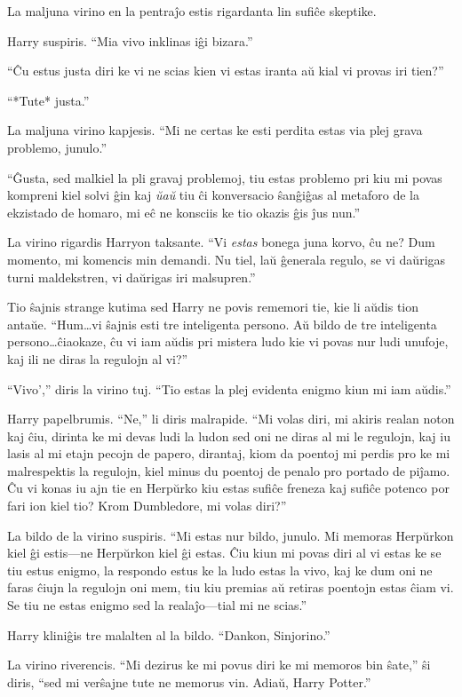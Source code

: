 La maljuna virino en la pentraĵo estis rigardanta lin sufiĉe skeptike.

Harry suspiris. ``Mia vivo inklinas iĝi bizara.''

``Ĉu estus justa diri ke vi ne scias kien vi estas iranta aŭ kial vi
provas iri tien?''

``*Tute* justa.''

La maljuna virino kapjesis. ``Mi ne certas ke esti perdita estas via
plej grava problemo, junulo.''

``Ĝusta, sed malkiel la pli gravaj problemoj, tiu estas problemo pri
kiu mi povas kompreni kiel solvi ĝin kaj \emph{ŭaŭ} tiu ĉi konversacio
ŝanĝiĝas al metaforo de la ekzistado de homaro, mi eĉ ne konsciis ke
tio okazis ĝis ĵus nun.''

La virino rigardis Harryon taksante. ``Vi \emph{estas} bonega juna
korvo, ĉu ne? Dum momento, mi komencis min demandi. Nu tiel, laŭ
ĝenerala regulo, se vi daŭrigas turni maldekstren, vi daŭrigas
iri malsupren.''

Tio ŝajnis strange kutima sed Harry ne povis rememori tie, kie li
aŭdis tion antaŭe. ``Hum\ldots vi ŝajnis esti tre inteligenta
persono. Aŭ bildo de tre inteligenta persono\ldots ĉiaokaze, ĉu vi iam
aŭdis pri mistera ludo kie vi povas nur ludi unufoje, kaj ili ne diras
la regulojn al vi?''

``Vivo','' diris la virino tuj. ``Tio estas la plej evidenta enigmo
kiun mi iam aŭdis.''

Harry papelbrumis. ``Ne,'' li diris malrapide. ``Mi volas diri, mi
akiris realan noton kaj ĉiu, dirinta ke mi devas ludi la ludon sed oni
ne diras al mi le regulojn, kaj iu lasis al mi etajn pecojn de papero,
dirantaj, kiom da poentoj mi perdis pro ke mi malrespektis la
regulojn, kiel minus du poentoj de penalo pro portado de piĵamo. Ĉu vi
konas iu ajn tie en Herpŭrko kiu estas sufiĉe freneza kaj sufiĉe
potenco por fari ion kiel tio? Krom Dumbledore, mi volas diri?''

La bildo de la virino suspiris. ``Mi estas nur bildo, junulo. Mi
memoras Herpŭrkon kiel ĝi estis—ne Herpŭrkon kiel ĝi estas. Ĉiu kiun
mi povas diri al vi estas ke se tiu estus enigmo, la respondo estus ke
la ludo estas la vivo, kaj ke dum oni ne faras ĉiujn la regulojn oni
mem, tiu kiu premias aŭ retiras poentojn estas ĉiam vi. Se tiu ne
estas enigmo sed la realaĵo—tial mi ne scias.''

Harry kliniĝis tre malalten al la bildo. ``Dankon, Sinjorino.''

La virino riverencis. ``Mi dezirus ke mi povus diri ke mi memoros bin
ŝate,'' ŝi diris, ``sed mi verŝajne tute ne memorus vin. Adiaŭ, Harry
Potter.'' 

